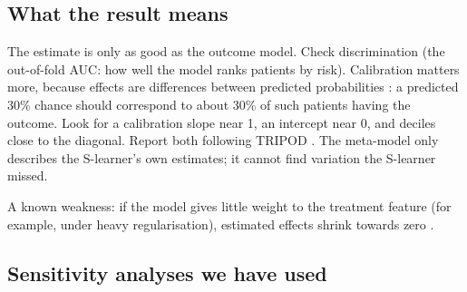 \subsection{What the result means}

The estimate is only as good as the outcome model. Check discrimination (the out-of-fold AUC: how well the model ranks patients by risk). Calibration matters more, because effects are differences between predicted probabilities \cite{vancalster2019}: a predicted 30\% chance should correspond to about 30\% of such patients having the outcome. Look for a calibration slope near 1, an intercept near 0, and deciles close to the diagonal. Report both following TRIPOD \cite{collins2015tripod}. The meta-model only describes the S-learner's own estimates; it cannot find variation the S-learner missed.

A known weakness: if the model gives little weight to the treatment feature (for example, under heavy regularisation), estimated effects shrink towards zero \cite{kunzel2019}.

\subsection{Sensitivity analyses we have used}

